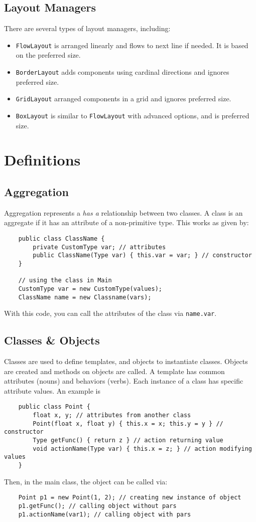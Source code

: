 \documentclass[letterpaper, openany, justified]{tufte-book}
\newcommand{\cd}[1]{\lstinline{#1}}
\begin{document}
\begin{fullwidth}
\section{Layout Managers}
There are several types of layout managers, including:
\begin{itemize}
    \item \cd{FlowLayout} is arranged linearly and flows to next line if needed. It is based on the preferred size.
    \item \cd{BorderLayout} adds components using cardinal directions and ignores preferred size.
    \item \cd{GridLayout} arranged components in a grid and ignores preferred size.
    \item \cd{BoxLayout} is similar to \cd{FlowLayout} with advanced options, and is preferred size.
\end{itemize}

\chapter{Definitions}

\section{Aggregation}
Aggregation represents a \textit{has a} relationship between two classes. A class is an aggregate if it has an attribute of a non-primitive type. This works as given by:
\begin{lstlisting}
    public class ClassName {
        private CustomType var; // attributes
        public ClassName(Type var) { this.var = var; } // constructor
    }

    // using the class in Main
    CustomType var = new CustomType(values);
    ClassName name = new Classname(vars);
\end{lstlisting}
With this code, you can call the attributes of the class via \cd{name.var}.
\section{Classes \& Objects}
Classes are used to define templates, and objects to instantiate classes. Objects are created and methods on objects are called. A template has common attributes (nouns) and behaviors (verbs). Each instance of a class has specific attribute values. An example is
\begin{lstlisting}
    public class Point {
        float x, y; // attributes from another class
        Point(float x, float y) { this.x = x; this.y = y } // constructor
        Type getFunc() { return z } // action returning value
        void actionName(Type var) { this.x = z; } // action modifying values
    }
\end{lstlisting}
Then, in the main class, the object can be called via:
\begin{lstlisting}
    Point p1 = new Point(1, 2); // creating new instance of object
    p1.getFunc(); // calling object without pars
    p1.actionName(var1); // calling object with pars
\end{lstlisting}


\end{fullwidth}
\end{document}
